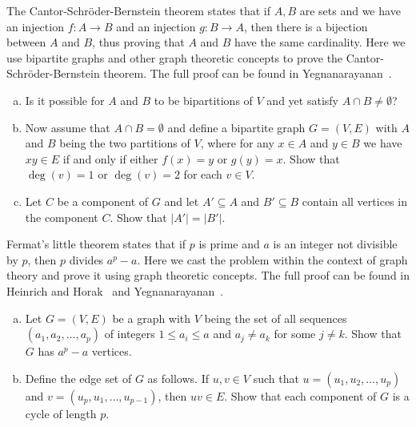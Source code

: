 \begin{problem}
\item The
  Cantor-Schr\"oder-Bernstein
  theorem states that if $A,B$ are sets and we have an injection
  $f: A \to B$ and an injection $g: B \to A$, then there is a
  bijection between $A$ and $B$, thus proving that $A$ and $B$ have
  the same cardinality. Here we use bipartite
  graphs and other graph theoretic concepts to prove the
  Cantor-Schr\"oder-Bernstein theorem. The full proof can be found in
  Yegnanarayanan~\cite{Yegnanarayanan2005}.
  \begin{enumerate}[(a)]
  \item Is it possible for $A$ and $B$ to be bipartitions of $V$ and
    yet satisfy $A \cap B \neq \emptyset$?

  \item Now assume that $A \cap B = \emptyset$ and define a bipartite
    graph $G = (V, E)$ with $A$ and $B$ being the two partitions of
    $V$, where for any $x \in A$ and $y \in B$ we have $xy \in E$ if
    and only if either $f(x) = y$ or $g(y) = x$. Show that
    $\deg(v) = 1$ or $\deg(v) = 2$ for each $v \in V$.

  \item Let $C$ be a component of $G$ and let $A' \subseteq A$ and
    $B' \subseteq B$ contain all vertices in the component $C$. Show
    that $|A'| = |B'|$.
  \end{enumerate}

\item Fermat's little theorem states
  that if $p$ is prime and $a$ is an integer not divisible by $p$,
  then $p$ divides $a^p - a$. Here we cast the problem within the
  context of graph theory and prove it using graph theoretic
  concepts. The full proof can be found in
  Heinrich and
  Horak~\cite{HeinrichHorak1994} and
  Yegnanarayanan~\cite{Yegnanarayanan2005}.
  \begin{enumerate}[(a)]
  \item Let $G = (V,E)$ be a graph with $V$ being the set of all
    sequences $(a_1, a_2, \dots, a_p)$ of integers
    $1 \leq a_i \leq a$ and $a_j \neq a_k$ for some $j \neq k$. Show
    that $G$ has $a^p - a$ vertices.

  \item Define the edge set of $G$ as follows. If $u,v \in V$ such
    that $u = (u_1, u_2, \dots, u_p)$ and
    $v = (u_p, u_1, \dots, u_{p-1})$, then $uv \in E$. Show that each
    component of $G$ is a cycle of length $p$.


\end{enumerate}
\end{problem}
